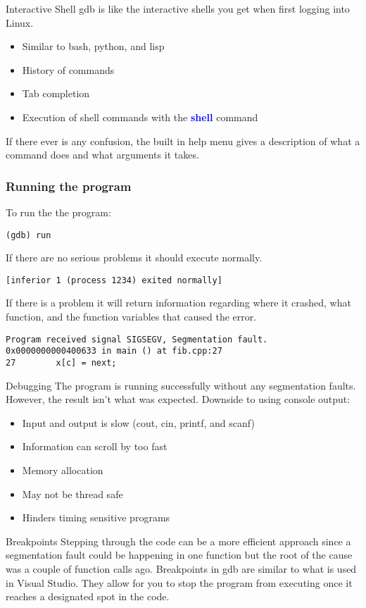 \documentclass[11pt]{beamer}
\begin{document}
\begin{frame}{Interactive Shell}
gdb is like the interactive shells you get when first logging into Linux.
\begin{itemize}
\item Similar to bash, python, and lisp
\item History of commands
\item Tab completion
\item Execution of shell commands with the \textbf{\textcolor{blue}{shell}} command
\end{itemize}
If there ever is any confusion, the built in help menu gives a description of what a command does and what arguments it takes.
\end{frame}

\begin{frame}[fragile]
\frametitle{Running the program}
To run the the program:
\begin{lstlisting}[style=BashInputStyle]
(gdb) run
\end{lstlisting}
If there are no serious problems it should execute normally.
\begin{lstlisting}[style=BashInputStyle]
[inferior 1 (process 1234) exited normally]
\end{lstlisting}
If there is a problem it will return information regarding where it crashed, what function, and the function variables that caused the error.
\begin{lstlisting}[style=BashInputStyle]
Program received signal SIGSEGV, Segmentation fault.
0x0000000000400633 in main () at fib.cpp:27
27        x[c] = next;
\end{lstlisting}
\end{frame}

\begin{frame}{Debugging}
The program is running successfully without any segmentation faults. However, the result isn't what was expected.
\break
\break
Downside to using console output:
\begin{itemize}
\item Input and output is slow (cout, cin, printf, and scanf)
\item Information can scroll by too fast
\item Memory allocation
\item May not be thread safe
\item Hinders timing sensitive programs
\end{itemize}
\end{frame}
\begin{frame}{Breakpoints}
Stepping through the code can be a more efficient approach since a segmentation fault could be happening in one function but the root of the cause was a couple of function calls ago.
\break
\break
Breakpoints in gdb are similar to what is used in Visual Studio. They allow for you to stop the program from executing once it reaches a designated spot in the code.
\end{frame}
\end{document}
